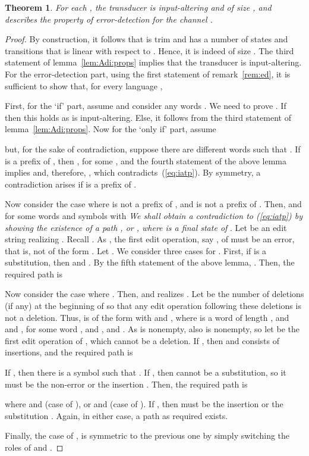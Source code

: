 \documentclass{article}
\theoremstyle{plain}
\newtheorem{theorem}{Theorem}[]
\theoremstyle{definition}
\theoremstyle{remark}
\begin{document}
\begin{theorem}\label{th:iat:ed}
For each , the transducer  is input-altering and of size , and
describes the property of error-detection for the channel .
\end{theorem}
\begin{proof}
By construction, it follows that  is trim and has a number of states and transitions that is linear with respect to . Hence, it is indeed of size .
The third statement of lemma~\ref{lem:Adi:props} implies that the transducer is input-altering.
For the error-detection part, using the first statement of remark~\ref{rem:ed}, it is sufficient  to show that, for every language ,


First, for the `if' part, assume  and consider any words .  We need to
prove .
If  then this holds as  is input-altering. Else, it follows from the third statement of
lemma~\ref{lem:Adi:props}.  Now for the `only if' part, assume

but, for the sake of contradiction,  suppose there are different words  such that . If  is a prefix of , then
, for some , and
the fourth statement of the above lemma implies
 and, therefore, , which contradicts~(\ref{eq:iatp}).
By symmetry, a contradiction arises if  is a prefix of .

Now consider the case where  is not a prefix of  , and  is not a prefix of . Then,  and  for some words  and   symbols  with 
\emph{We shall obtain a contradiction
to (\ref{eq:iatp}) by showing the existence of a path , or , where  is a final state of }.
Let  be an edit string realizing
. Recall . As , the first edit operation, say  , of  must
be an error, that is, not of the form . Let . We consider three cases for .
First, if  is a substitution, then   and . By the fifth statement of the above lemma, . Then, the required path is


Now consider the case where . Then,  and  realizes . Let  be the number of deletions (if any) at the beginning of  so that any edit operation
following these deletions is not a deletion. Thus,  is of the form  with 
and , where  is a word of length , and
 and , for some word , and
,
and .
As  is nonempty, also  is nonempty, so let  be the first edit operation of , which
cannot be a deletion.
If , then  and  consists of insertions, and the required path is

If , then there is a symbol  such that .
If , then   cannot be a substitution, so it must be the non-error  or the insertion
. Then, the required path is

where  and  (case of ), or  and  (case of ).
If , then  must be the insertion  or the substitution . Again, in either case,
a path as required exists.

Finally, the case of , is symmetric to the previous one by simply switching the
roles of  and .
\end{proof}
\end{document}
